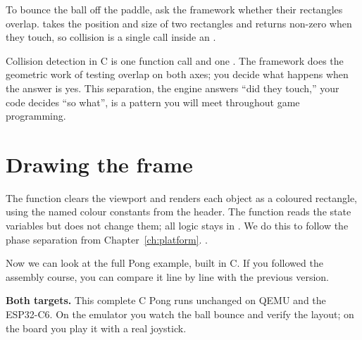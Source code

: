 To bounce the ball off the paddle, ask the framework whether their rectangles
overlap.  takes the position and size of two
rectangles and returns non-zero when they touch, so collision is a single call
inside an  \citep{prg32repo}.



\begin{prgconcept}
Collision detection in C is one function call and one . The framework
does the geometric work of testing overlap on both axes; you decide what happens
when the answer is yes. This separation, the engine answers ``did they touch,''
your code decides ``so what'', is a pattern you will meet throughout game
programming.
\end{prgconcept}

\section{Drawing the frame}

The  function clears the viewport and renders each object as a coloured
rectangle, using the named colour constants from the header. The  function 
reads the state variables but does not change them; all logic stays in .
We do this to follow the phase separation from Chapter~\ref{ch:platform}.
\citep{prg32tutorialc}.



Now we can look at the full Pong example, built in C. If you followed the assembly course,
you can compare it line by line with the previous version.



\begin{prgtargets}
\textbf{Both targets.} This complete C Pong runs unchanged on QEMU and the
ESP32\nobreakdash-C6. On the emulator you watch the ball bounce and verify the layout; on
the board you play it with a real joystick.
\end{prgtargets}

